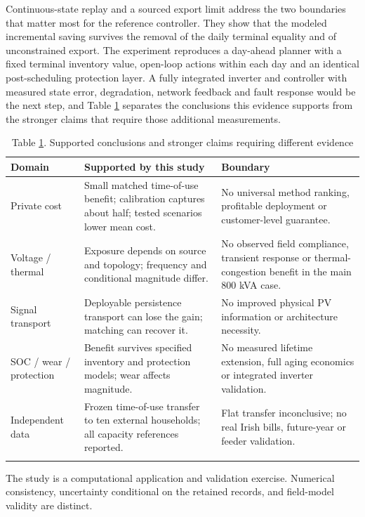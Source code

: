 \documentclass[pdflatex,Numbered,sn-basic]{sn-jnl}
\begin{document}
Continuous-state replay and a sourced export limit address the two boundaries that matter most for the reference controller. They show that the modeled incremental saving survives the removal of the daily terminal equality and of unconstrained export. The experiment reproduces a day-ahead planner with a fixed terminal inventory value, open-loop actions within each day and an identical post-scheduling protection layer. A fully integrated inverter and controller with measured state error, degradation, network feedback and fault response would be the next step, and Table \ref{tab5} separates the conclusions this evidence supports from the stronger claims that require those additional measurements.

\begin{table}[htbp]
\centering
\caption{Table \ref{tab5}. Supported conclusions and stronger claims requiring different evidence}
\label{tab5}
\footnotesize
\setlength{\tabcolsep}{3pt}
\begin{tabular}{@{}p{86pt}p{138pt}p{136pt}@{}}
\toprule
\textbf{Domain} & \textbf{Supported by this study} & \textbf{Boundary} \\
\midrule
Private cost & Small matched time-of-use benefit; calibration captures about half; tested scenarios lower mean cost. & No universal method ranking, profitable deployment or customer-level guarantee. \\
Voltage / thermal & Exposure depends on source and topology; frequency and conditional magnitude differ. & No observed field compliance, transient response or thermal-congestion benefit in the main 800 kVA case. \\
Signal transport & Deployable persistence transport can lose the gain; matching can recover it. & No improved physical PV information or architecture necessity. \\
SOC / wear / protection & Benefit survives specified inventory and protection models; wear affects magnitude. & No measured lifetime extension, full aging economics or integrated inverter validation. \\
Independent data & Frozen time-of-use transfer to ten external households; all capacity references reported. & Flat transfer inconclusive; no real Irish bills, future-year or feeder validation. \\
\botrule
\end{tabular}
\par\vspace{2pt}
\footnotesize The study is a computational application and validation exercise. Numerical consistency, uncertainty conditional on the retained records, and field-model validity are distinct.
\end{table}
\end{document}
